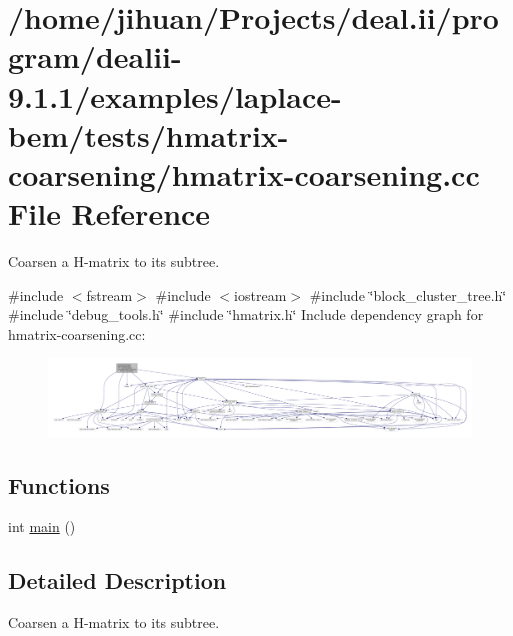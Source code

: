 \hypertarget{hmatrix-coarsening_8cc}{}\section{/home/jihuan/\+Projects/deal.ii/program/dealii-\/9.1.1/examples/laplace-\/bem/tests/hmatrix-\/coarsening/hmatrix-\/coarsening.cc File Reference}
\label{hmatrix-coarsening_8cc}


Coarsen a H-\/matrix to its subtree.  


{\ttfamily \#include $<$fstream$>$}\newline
{\ttfamily \#include $<$iostream$>$}\newline
{\ttfamily \#include \char`\"{}block\+\_\+cluster\+\_\+tree.\+h\char`\"{}}\newline
{\ttfamily \#include \char`\"{}debug\+\_\+tools.\+h\char`\"{}}\newline
{\ttfamily \#include \char`\"{}hmatrix.\+h\char`\"{}}\newline
Include dependency graph for hmatrix-\/coarsening.cc\+:
\nopagebreak
\begin{figure}[H]
\begin{center}
\leavevmode
\includegraphics[width=350pt]{hmatrix-coarsening_8cc__incl}
\end{center}
\end{figure}
\subsection*{Functions}
\begin{DoxyCompactItemize}
\item 
int \hyperlink{hmatrix-coarsening_8cc_ae66f6b31b5ad750f1fe042a706a4e3d4}{main} ()
\end{DoxyCompactItemize}


\subsection{Detailed Description}
Coarsen a H-\/matrix to its subtree. 

